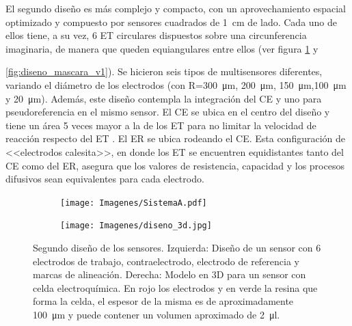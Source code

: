		 	 El segundo diseño es más complejo y compacto, con un aprovechamiento espacial optimizado y compuesto por sensores cuadrados de \SI{1}{\cm} de lado. Cada uno de ellos tiene, a su vez, 6 ET circulares dispuestos sobre una circunferencia imaginaria, de manera que queden equiangulares entre ellos (ver figura \ref{fig:mascara_diseno_v2} y {\ref{fig:diseno_mascara_v1}). Se hicieron seis tipos de multisensores diferentes, variando el diámetro de los electrodos (con R=\SI{300}{\um}, \SI{200}{\um}, \SI{150}{\um},\SI{100}{\um} y \SI{20}{\um}). Además, este diseño contempla la integración del CE y uno para pseudoreferencia en el mismo sensor. El CE se ubica en el centro del diseño y tiene un área 5 veces mayor a la de los ET para no limitar la velocidad de reacción respecto del ET \cite{Wi2000}. El ER se ubica rodeando el CE. Esta configuración de <<electrodos calesita>>, en donde los ET se encuentren equidistantes tanto del CE como del ER, asegura que los valores de resistencia, capacidad y los procesos difusivos sean equivalentes para cada electrodo.\cite{Bockris1974}

		  
			     \begin{figure}[b!]
			 	    \begin{subfigure}[t]{0.395\textwidth}
			       	\texttt{[image: Imagenes/SistemaA.pdf]}
			    	\end{subfigure}
					\begin{subfigure}[t]{0.595\textwidth}
			        \texttt{[image: Imagenes/diseno\_3d.jpg]}
			        \end{subfigure}
			     	\caption[Segundo diseño y máscara de los sensores]{Segundo diseño de los sensores. Izquierda: Diseño de un sensor con 6 electrodos de trabajo, contraelectrodo, electrodo de referencia y marcas de alineación. Derecha: Modelo en 3D para un sensor con celda electroquímica. En rojo los electrodos y en verde la resina que forma la celda, el espesor de la misma es de aproximadamente \SI{100}{\um} y puede contener un volumen aproximado de \SI{2}{\ul}.}
			     	\label{fig:mascara_diseno_v2}
			     	\end{figure}
	   
}
